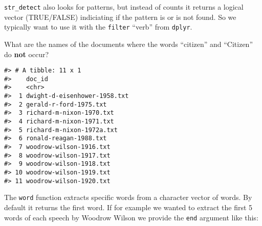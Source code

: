 \documentclass[]{book}
\newenvironment{Shaded}{\begin{snugshade}}{\end{snugshade}}
\newcommand{\CommentTok}[1]{\textcolor[rgb]{0.56,0.35,0.01}{\textit{#1}}}
\newcommand{\DataTypeTok}[1]{\textcolor[rgb]{0.13,0.29,0.53}{#1}}
\newcommand{\DecValTok}[1]{\textcolor[rgb]{0.00,0.00,0.81}{#1}}
\newcommand{\KeywordTok}[1]{\textcolor[rgb]{0.13,0.29,0.53}{\textbf{#1}}}
\newcommand{\NormalTok}[1]{#1}
\newcommand{\OperatorTok}[1]{\textcolor[rgb]{0.81,0.36,0.00}{\textbf{#1}}}
\newcommand{\StringTok}[1]{\textcolor[rgb]{0.31,0.60,0.02}{#1}}
\begin{document}
\texttt{str\_detect} also looks for patterns, but instead of counts it returns a logical vector (TRUE/FALSE) indiciating if the pattern is or is not found. So we typically want to use it with the \texttt{filter} ``verb'' from \texttt{dplyr}.

What are the names of the documents where the words ``citizen'' and ``Citizen'' do \textbf{not} occur?

\begin{Shaded}
\end{Shaded}

\begin{verbatim}
#> # A tibble: 11 x 1
#>    doc_id                      
#>    <chr>                       
#>  1 dwight-d-eisenhower-1958.txt
#>  2 gerald-r-ford-1975.txt      
#>  3 richard-m-nixon-1970.txt    
#>  4 richard-m-nixon-1971.txt    
#>  5 richard-m-nixon-1972a.txt   
#>  6 ronald-reagan-1988.txt      
#>  7 woodrow-wilson-1916.txt     
#>  8 woodrow-wilson-1917.txt     
#>  9 woodrow-wilson-1918.txt     
#> 10 woodrow-wilson-1919.txt     
#> 11 woodrow-wilson-1920.txt
\end{verbatim}

The \texttt{word} function extracts specific words from a character vector of words. By default it returns the first word. If for example we wanted to extract the first 5 words of each speech by Woodrow Wilson we provide the \texttt{end} argument like this:

\begin{Shaded}
\end{Shaded}
\end{document}
